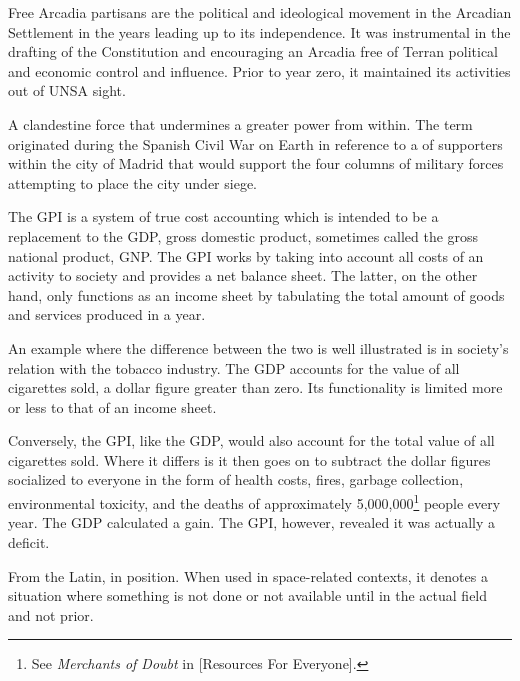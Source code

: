 Free Arcadia partisans are the political and ideological movement in the Arcadian Settlement in the years leading up to its independence. It was instrumental in the drafting of the Constitution and encouraging an Arcadia free of Terran political and economic control and influence. Prior to year zero, it maintained its activities out of UNSA sight.
\stopdefinition

A clandestine force that undermines a greater power from within. The term originated during the Spanish Civil War on Earth in reference to a  of supporters within the city of Madrid that would support the four columns of military forces attempting to place the city under siege.
\stopdefinition

The GPI is a system of true cost accounting which is intended to be a replacement to the GDP, gross domestic product, sometimes called the gross national product, GNP. The GPI works by taking into account all costs of an activity to society and provides a net balance sheet. The latter, on the other hand, only functions as an income sheet by tabulating the total amount of goods and services produced in a year. 

An example where the difference between the two is well illustrated is in society's relation with the tobacco industry. The GDP accounts for the value of all cigarettes sold, a dollar figure greater than zero. Its functionality is limited more or less to that of an income sheet.

Conversely, the GPI, like the GDP, would also account for the total value of all cigarettes sold. Where it differs is it then goes on to subtract the dollar figures socialized to everyone in the form of health costs, fires, garbage collection, environmental toxicity, and the deaths of approximately 5,000,000\footnote{See {\it Merchants of Doubt} in [Resources For Everyone].} people every year. The GDP calculated a gain. The GPI, however, revealed it was actually a deficit.
\stopdefinition

From the Latin, in position. When used in space-related contexts, it denotes a situation where something is not done or not available until in the actual field and not prior.
\stopdefinition


